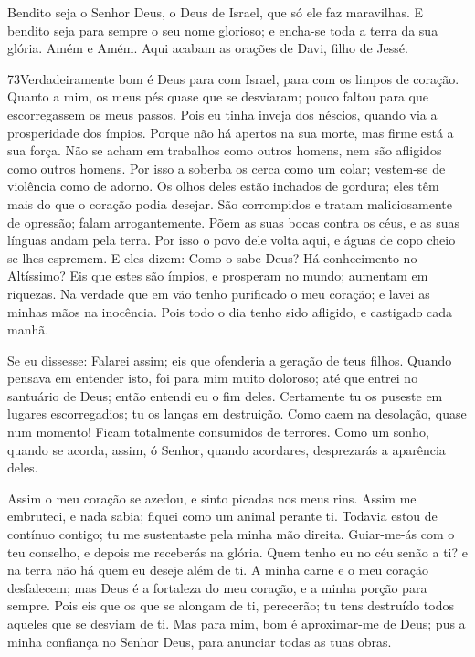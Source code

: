 Bendito seja o Senhor Deus, o Deus de Israel, que só ele faz
maravilhas. E bendito seja para sempre o seu nome glorioso; e
encha-se toda a terra da sua glória. Amém e Amém. Aqui acabam
as orações de Davi, filho de Jessé.

\bigskip

\lettrine{73}{}Verdadeiramente bom é Deus para com Israel, para
com os limpos de coração. Quanto a mim, os meus pés quase que se
desviaram; pouco faltou para que escorregassem os meus passos.
Pois eu tinha inveja dos néscios, quando via a prosperidade dos
ímpios. Porque não há apertos na sua morte, mas firme está a sua
força. Não se acham em trabalhos como outros homens, nem são
afligidos como outros homens. Por isso a soberba os cerca como
um colar; vestem-se de violência como de adorno. Os olhos deles
estão inchados de gordura; eles têm mais do que o coração podia
desejar. São corrompidos e tratam maliciosamente de opressão;
falam arrogantemente. Põem as suas bocas contra os céus, e as
suas línguas andam pela terra. Por isso o povo dele volta
aqui, e águas de copo cheio se lhes espremem. E eles dizem:
Como o sabe Deus? Há conhecimento no Altíssimo? Eis que estes
são ímpios, e prosperam no mundo; aumentam em riquezas. Na
verdade que em vão tenho purificado o meu coração; e lavei as minhas
mãos na inocência. Pois todo o dia tenho sido afligido, e
castigado cada manhã.

Se eu dissesse: Falarei assim; eis que ofenderia a geração de
teus filhos. Quando pensava em entender isto, foi para mim
muito doloroso; até que entrei no santuário de Deus; então
entendi eu o fim deles. Certamente tu os puseste em lugares
escorregadios; tu os lanças em destruição. Como caem na
desolação, quase num momento! Ficam totalmente consumidos de
terrores. Como um sonho, quando se acorda, assim, ó Senhor,
quando acordares, desprezarás a aparência deles.

Assim o meu coração se azedou, e sinto picadas nos meus rins.
Assim me embruteci, e nada sabia; fiquei como um animal
perante ti. Todavia estou de contínuo contigo; tu me
sustentaste pela minha mão direita. Guiar-me-ás com o teu
conselho, e depois me receberás na glória. Quem tenho eu no
céu senão a ti? e na terra não há quem eu deseje além de ti.
A minha carne e o meu coração desfalecem; mas Deus é a
fortaleza do meu coração, e a minha porção para sempre. Pois
eis que os que se alongam de ti, perecerão; tu tens destruído todos
aqueles que se desviam de ti. Mas para mim, bom é
aproximar-me de Deus; pus a minha confiança no Senhor Deus, para
anunciar todas as tuas obras.

